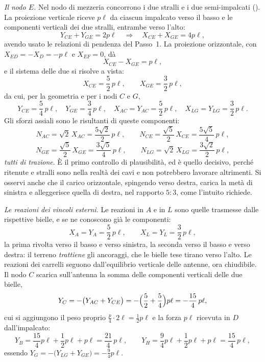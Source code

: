 



\medskip
\noindent\emph{Il nodo $E$.}
Nel nodo di mezzeria concorrono i due stralli e i due
semi-impalcati (). La
proiezione verticale riceve $p\ell$ da ciascun impalcato
verso il basso e le componenti verticali dei due stralli,
entrambe verso l'alto:
\[
	Y_{CE} + Y_{GE} = 2p\ell
	\quad\Longrightarrow\quad
	X_{CE} + X_{GE} = 4p\ell ,
\]
avendo usato le relazioni di pendenza del Passo~1. La
proiezione orizzontale, con $X_{ED} = -X_D = -p\ell$ e
$X_{EF} = 0$, dà
\[
	X_{CE} - X_{GE} = p\ell ,
\]
e il sistema delle due si risolve a vista:
\[
	X_{CE} = \frac{5}{2}\,p\ell , \qquad
	X_{GE} = \frac{3}{2}\,p\ell ,
\]
da cui, per la geometria e per i nodi $C$ e $G$,
\[
	Y_{CE} = \frac{5}{4}\,p\ell , \quad
	Y_{GE} = \frac{3}{4}\,p\ell , \quad
	X_{AC} = Y_{AC} = \frac{5}{2}\,p\ell , \quad
	X_{LG} = Y_{LG} = \frac{3}{2}\,p\ell .
\]
Gli sforzi assiali sono le risultanti di queste componenti:
\[
	N_{AC} = \sqrt2\,X_{AC} = \frac{5\sqrt2}{2}\,p\ell ,
	\qquad
	N_{CE} = \frac{\sqrt5}{2}\,X_{CE} = \frac{5\sqrt5}{4}\,p\ell ,
\]
\[
	N_{GE} = \frac{\sqrt5}{2}\,X_{GE} = \frac{3\sqrt5}{4}\,p\ell ,
	\qquad
	N_{LG} = \sqrt2\,X_{LG} = \frac{3\sqrt2}{2}\,p\ell ,
\]
\emph{tutti di trazione}. È il primo controllo di
plausibilità, ed è quello decisivo, perché ritenute e
stralli sono nella realtà dei cavi e non potrebbero lavorare
altrimenti. Si osservi anche che il carico orizzontale,
spingendo verso destra, carica la metà di sinistra e
alleggerisce quella di destra, nel rapporto $5:3$, come
l'intuito richiede.





\medskip
\noindent\emph{Le reazioni dei vincoli esterni.}
Le reazioni in $A$ e in $L$ sono quelle trasmesse dalle
rispettive bielle, e se ne conoscono già le componenti:
\[
	X_A = Y_A = \frac{5}{2}\,p\ell , \qquad
	X_L = Y_L = \frac{3}{2}\,p\ell ,
\]
la prima rivolta verso il basso e verso sinistra, la seconda
verso il basso e verso destra: il terreno \emph{trattiene}
gli ancoraggi, che le bielle tese tirano verso l'alto. Le
reazioni dei carrelli seguono dall'equilibrio verticale
delle antenne, ora chiudibile. Il nodo $C$ scarica
sull'antenna la somma delle componenti verticali delle due
bielle,
\[
	Y_C = -\bigl(Y_{AC} + Y_{CE}\bigr)
	    = -\Bigl(\frac{5}{2} + \frac{5}{4}\Bigr)p\ell
	    = -\frac{15}{4}\,p\ell ,
\]
cui si aggiungono il peso proprio
$\tfrac{p}{4}\cdot 2\ell = \tfrac12 p\ell$ e la forza $p\ell$
ricevuta in $D$ dall'impalcato:
\[
	Y_B = \frac{15}{4}p\ell + \frac{1}{2}p\ell + p\ell
	    = \frac{21}{4}\,p\ell , \qquad
	Y_H = \frac{9}{4}p\ell + \frac{1}{2}p\ell + p\ell
	    = \frac{15}{4}\,p\ell ,
\]
essendo $Y_G = -\bigl(Y_{LG} + Y_{GE}\bigr) = -\tfrac94 p\ell$.

